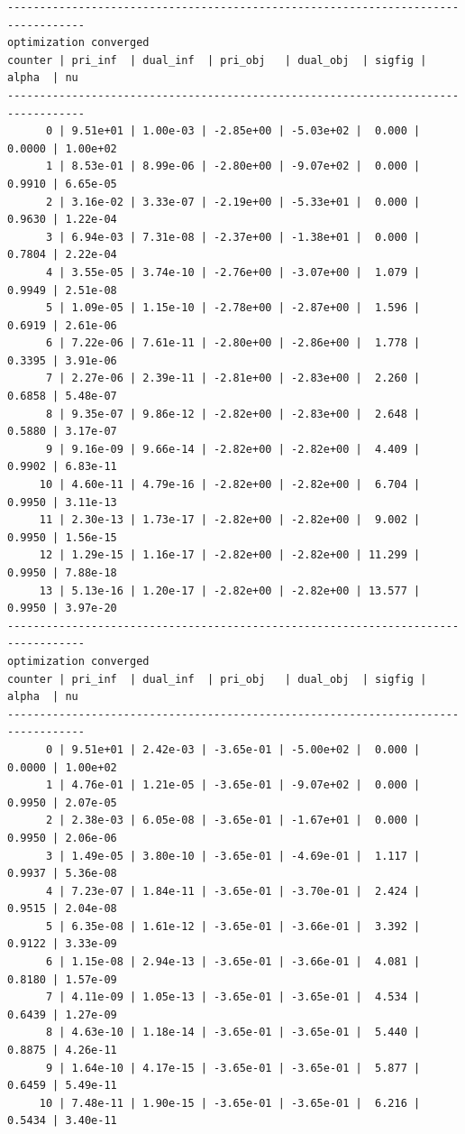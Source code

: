 \documentclass[
]{book}
\begin{document}
\begin{verbatim}
----------------------------------------------------------------------------------
optimization converged
counter | pri_inf  | dual_inf  | pri_obj   | dual_obj  | sigfig | alpha  | nu 
----------------------------------------------------------------------------------
      0 | 9.51e+01 | 1.00e-03 | -2.85e+00 | -5.03e+02 |  0.000 | 0.0000 | 1.00e+02
      1 | 8.53e-01 | 8.99e-06 | -2.80e+00 | -9.07e+02 |  0.000 | 0.9910 | 6.65e-05
      2 | 3.16e-02 | 3.33e-07 | -2.19e+00 | -5.33e+01 |  0.000 | 0.9630 | 1.22e-04
      3 | 6.94e-03 | 7.31e-08 | -2.37e+00 | -1.38e+01 |  0.000 | 0.7804 | 2.22e-04
      4 | 3.55e-05 | 3.74e-10 | -2.76e+00 | -3.07e+00 |  1.079 | 0.9949 | 2.51e-08
      5 | 1.09e-05 | 1.15e-10 | -2.78e+00 | -2.87e+00 |  1.596 | 0.6919 | 2.61e-06
      6 | 7.22e-06 | 7.61e-11 | -2.80e+00 | -2.86e+00 |  1.778 | 0.3395 | 3.91e-06
      7 | 2.27e-06 | 2.39e-11 | -2.81e+00 | -2.83e+00 |  2.260 | 0.6858 | 5.48e-07
      8 | 9.35e-07 | 9.86e-12 | -2.82e+00 | -2.83e+00 |  2.648 | 0.5880 | 3.17e-07
      9 | 9.16e-09 | 9.66e-14 | -2.82e+00 | -2.82e+00 |  4.409 | 0.9902 | 6.83e-11
     10 | 4.60e-11 | 4.79e-16 | -2.82e+00 | -2.82e+00 |  6.704 | 0.9950 | 3.11e-13
     11 | 2.30e-13 | 1.73e-17 | -2.82e+00 | -2.82e+00 |  9.002 | 0.9950 | 1.56e-15
     12 | 1.29e-15 | 1.16e-17 | -2.82e+00 | -2.82e+00 | 11.299 | 0.9950 | 7.88e-18
     13 | 5.13e-16 | 1.20e-17 | -2.82e+00 | -2.82e+00 | 13.577 | 0.9950 | 3.97e-20
----------------------------------------------------------------------------------
optimization converged
counter | pri_inf  | dual_inf  | pri_obj   | dual_obj  | sigfig | alpha  | nu 
----------------------------------------------------------------------------------
      0 | 9.51e+01 | 2.42e-03 | -3.65e-01 | -5.00e+02 |  0.000 | 0.0000 | 1.00e+02
      1 | 4.76e-01 | 1.21e-05 | -3.65e-01 | -9.07e+02 |  0.000 | 0.9950 | 2.07e-05
      2 | 2.38e-03 | 6.05e-08 | -3.65e-01 | -1.67e+01 |  0.000 | 0.9950 | 2.06e-06
      3 | 1.49e-05 | 3.80e-10 | -3.65e-01 | -4.69e-01 |  1.117 | 0.9937 | 5.36e-08
      4 | 7.23e-07 | 1.84e-11 | -3.65e-01 | -3.70e-01 |  2.424 | 0.9515 | 2.04e-08
      5 | 6.35e-08 | 1.61e-12 | -3.65e-01 | -3.66e-01 |  3.392 | 0.9122 | 3.33e-09
      6 | 1.15e-08 | 2.94e-13 | -3.65e-01 | -3.66e-01 |  4.081 | 0.8180 | 1.57e-09
      7 | 4.11e-09 | 1.05e-13 | -3.65e-01 | -3.65e-01 |  4.534 | 0.6439 | 1.27e-09
      8 | 4.63e-10 | 1.18e-14 | -3.65e-01 | -3.65e-01 |  5.440 | 0.8875 | 4.26e-11
      9 | 1.64e-10 | 4.17e-15 | -3.65e-01 | -3.65e-01 |  5.877 | 0.6459 | 5.49e-11
     10 | 7.48e-11 | 1.90e-15 | -3.65e-01 | -3.65e-01 |  6.216 | 0.5434 | 3.40e-11

\end{verbatim}
\end{document}
